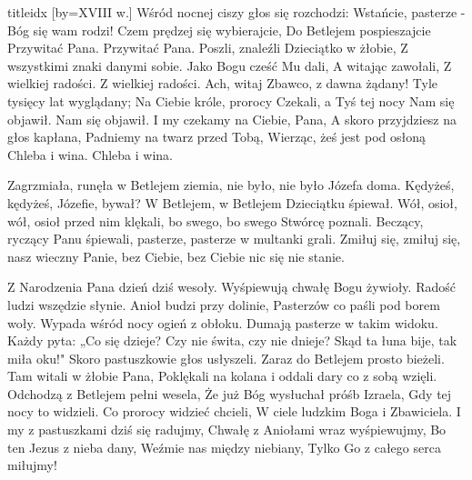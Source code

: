 \documentclass[a5paper, portrait, 12pt]{mwart}
\begin{document}
\begin{songs}{titleidx}
\endsong
[by={XVIII w.}]
\beginverse
    Wśród nocnej ciszy głos się rozchodzi:
    Wstańcie, pasterze - Bóg się wam rodzi!
    Czem prędzej się wybierajcie,
    Do Betlejem pospieszajcie
    Przywitać Pana.
    Przywitać Pana.
\endverse
\beginverse
    Poszli, znaleźli Dzieciątko w żłobie,
    Z wszystkimi znaki danymi sobie.
    Jako Bogu cześć Mu dali,
    A witając zawołali,
    Z wielkiej radości.
    Z wielkiej radości.
\endverse
\beginverse
    Ach, witaj Zbawco, z dawna żądany!
    Tyle tysięcy lat wyglądany;
    Na Ciebie króle, prorocy
    Czekali, a Tyś tej nocy
    Nam się objawił.
    Nam się objawił.
\endverse
\beginverse
    I my czekamy na Ciebie, Pana,
    A skoro przyjdziesz na głos kapłana,
    Padniemy na twarz przed Tobą,
    Wierząc, żeś jest pod osłoną
    Chleba i wina.
    Chleba i wina.
\endverse
\endsong



\beginverse
Zagrzmiała, runęła w Betlejem ziemia,
nie było, nie było Józefa doma.
\endverse
\beginverse
Kędyżeś, kędyżeś, Józefie, bywał?
W Betlejem, w Betlejem Dzieciątku śpiewał.
\endverse
\beginverse
Wół, osioł, wół, osioł przed nim klękali,
bo swego, bo swego Stwórcę poznali.
\endverse
\beginverse
Beczący, ryczący Panu śpiewali,
pasterze, pasterze w multanki grali.
\endverse
\beginverse
Zmiłuj się, zmiłuj się, nasz wieczny Panie,
bez Ciebie, bez Ciebie nic się nie stanie.
\endverse
\endsong

\beginverse
Z Narodzenia Pana dzień dziś wesoły.
Wyśpiewują chwałę Bogu żywioły.
Radość ludzi wszędzie słynie.
Anioł budzi przy dolinie,
Pasterzów co paśli pod borem woły.
\endverse
\beginverse
Wypada wśród nocy ogień z obłoku.
Dumają pasterze w takim widoku.
Każdy pyta: „Co się dzieje?
Czy nie świta, czy nie dnieje?
Skąd ta łuna bije, tak miła oku!"
\endverse
\beginverse
Skoro pastuszkowie głos usłyszeli.
Zaraz do Betlejem prosto bieżeli.
Tam witali w żłobie Pana,
Poklękali na kolana i oddali dary co z sobą wzięli.
\endverse
\beginverse
Odchodzą z Betlejem pełni wesela,
Że już Bóg wysłuchał próśb Izraela,
Gdy tej nocy to widzieli.
Co prorocy widzieć chcieli,
W ciele ludzkim Boga i Zbawiciela.
\endverse
\beginverse
I my z pastuszkami dziś się radujmy,
Chwałę z Aniołami wraz wyśpiewujmy,
Bo ten Jezus z nieba dany,
Weźmie nas między niebiany,
Tylko Go z całego serca miłujmy!
\endverse
\endsong


\end{songs}
\end{document}
